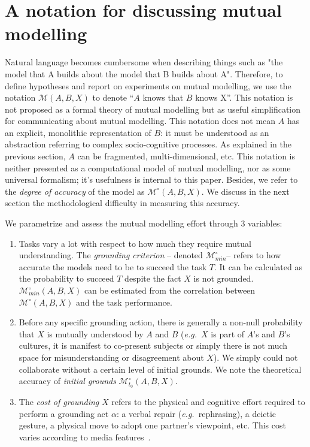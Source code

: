 \documentclass[natbib]{svjour3}
\newcommand{\eg}{{\textit{e.g.\ }}}
\newcommand{\model}[3]{{$\mathcal{M}(#1, #2, #3)$}}
\newcommand{\Model}[3]{{$\mathcal{M}^{\circ}(#1, #2, #3)$}}
\newcommand{\groundingcriterion}{{$\mathcal{M}^{\circ}_{min}$}}
\begin{document}
\section{A notation for discussing mutual modelling }

Natural language becomes cumbersome when describing things such as "the model
that A builds about the model that B builds about A". Therefore, to define
hypotheses and report on experiments on mutual modelling, we use  the notation
\model{A}{B}{X} to denote ``$A$ knows that $B$ knows X''. This  notation is not
proposed as a formal theory of mutual modelling but as useful simplification for
communicating about mutual modelling. This notation does not mean $A$ has an
explicit, monolithic representation of $B$: it must be understood as an
abstraction referring to complex socio-cognitive processes.  As explained in the
previous section, $A$ can be fragmented, multi-dimensional, etc. This notation
is neither presented as a computational model of mutual modelling, nor as some
universal formalism; it's usefulness is internal to this paper.  Besides, we
refer to the \emph{degree of accuracy} of the model as \Model{A}{B}{X}. We
discuss in the next section the methodological difficulty in measuring this
accuracy.

We parametrize and assess the mutual modelling effort through 3 variables:

\begin{enumerate}

    \item Tasks vary a lot with respect to how much they require mutual
        understanding.  The \emph{grounding criterion} -- denoted
        \groundingcriterion -- refers to how accurate the models need to be to
        succeed the task $T$. It can be calculated as the probability to succeed
        $T$ despite the fact $X$ is not grounded.
        $\mathcal{M}^{\circ}_{min}(A,B,X)$ can be estimated from the correlation
        between \Model{A}{B}{X} and the task performance. 

    \item Before any specific grounding action, there is generally a non-null
        probability that $X$ is mutually understood by $A$ and $B$ (\eg $X$ is
        part of $A$'s and $B$'s cultures, it is manifest to co-present subjects
        or simply there is not much space for misunderstanding or disagreement
        about $X$). We simply could not collaborate without a certain level of
        initial grounds. We note the theoretical accuracy of \emph{initial
        grounds} $\mathcal{M}^{\circ}_{t_0}(A,B,X)$.

    \item The \emph{cost of grounding} $X$ refers to the physical and cognitive
        effort required to perform a grounding act $\alpha$: a verbal repair
        (\eg rephrasing), a deictic gesture, a physical move to adopt one
        partner's viewpoint, etc. This cost varies according to media
        features~\citep{clark1991grounding}.

\end{enumerate}
\end{document}
